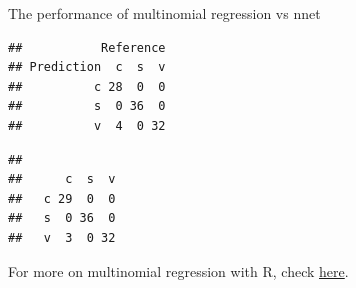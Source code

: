 \documentclass[10pt,ignorenonframetext,]{beamer}
\newenvironment{Shaded}{\begin{snugshade}}{\end{snugshade}}
\newcommand{\DataTypeTok}[1]{\textcolor[rgb]{0.13,0.29,0.53}{#1}}
\newcommand{\KeywordTok}[1]{\textcolor[rgb]{0.13,0.29,0.53}{\textbf{#1}}}
\newcommand{\NormalTok}[1]{#1}
\newcommand{\OperatorTok}[1]{\textcolor[rgb]{0.81,0.36,0.00}{\textbf{#1}}}
\newcommand{\StringTok}[1]{\textcolor[rgb]{0.31,0.60,0.02}{#1}}
\begin{document}
\begin{frame}[fragile]

\begin{block}{The performance of multinomial regression vs nnet}

\scriptsize

\begin{Shaded}
\end{Shaded}

\begin{verbatim}
##           Reference
## Prediction  c  s  v
##          c 28  0  0
##          s  0 36  0
##          v  4  0 32
\end{verbatim}

\begin{Shaded}
\end{Shaded}

\begin{verbatim}
##    
##      c  s  v
##   c 29  0  0
##   s  0 36  0
##   v  3  0 32
\end{verbatim}

\end{block}

\end{frame}

\begin{frame}

For more on multinomial regression with R, check
\href{https://www.r-bloggers.com/\%F0\%9F\%93\%8A-multinomial-regression-in-r/}{here}.

\end{frame}
\end{document}
